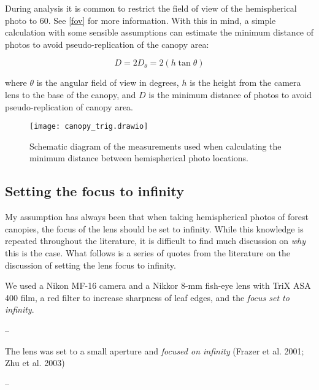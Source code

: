 \documentclass{article}
\begin{document}
During analysis it is common to restrict the field of view of the hemispherical photo to 60\textdegree{}. See \autoref{fov} for more information. With this in mind, a simple calculation with some sensible assumptions can estimate the minimum distance of photos to avoid pseudo-replication of the canopy area:

\begin{equation}
	D = 2D_{\theta} = 2(h \tan{\theta})
\end{equation}

where $\theta$ is the angular field of view in degrees, $h$ is the height from the camera lens to the base of the canopy, and $D$ is the minimum distance of photos to avoid pseudo-replication of canopy area.

\begin{figure}[H]
\centering
	\texttt{[image: canopy\_trig.drawio]}
	\caption{Schematic diagram of the measurements used when calculating the minimum distance between hemispherical photo locations.}
	\label{canopy_trig}
\end{figure}

\subsection{Setting the focus to infinity} 

My assumption has always been that when taking hemispherical photos of forest canopies, the focus of the lens should be set to infinity. While this knowledge is repeated throughout the literature, it is difficult to find much discussion on \textit{why} this is the case. What follows is a series of quotes from the literature on the discussion of setting the lens focus to infinity.

\begin{minipage}{\linewidth}
\begin{framed}
We used a Nikon MF-16 camera and a Nikkor 8-mm fish-eye lens with TriX ASA 400 film, a red filter to increase sharpness of leaf edges, and the \textit{focus set to infinity}.

-- \citealt{Englund2000}
\end{framed}
\end{minipage}

\begin{minipage}{\linewidth}
\begin{framed}
The lens was set to a small aperture and \textit{focused on infinity} (Frazer et al. 2001; Zhu et al. 2003)

-- \citealt{Hu2009}
\end{framed}
\end{minipage}
\end{document}
